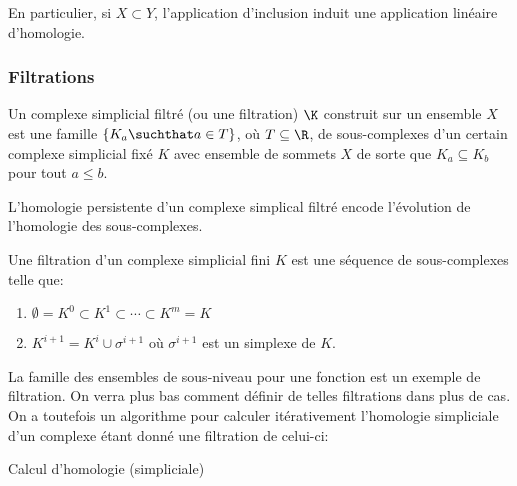 \begin{remarque}
	En particulier, si $X \subset Y$, l'application d'inclusion induit une application linéaire d'homologie.
\end{remarque}

\subsubsection{Filtrations}
\begin{definition}
	Un complexe simplicial filtré (ou une filtration) $\K$ construit sur un ensemble $X$ est une famille
	$\left\{K_{a} \suchthat a \in T\right\}$, où $T \subseteq \R$, de sous-complexes d'un
	certain complexe simplicial fixé $K$ avec ensemble de sommets $X$ de sorte que $K_{a} \subseteq K_{b}$
	pour tout $a \leq b$.
\end{definition}

L'homologie persistente d'un complexe simplical filtré encode l'évolution de l'homologie des sous-complexes.

\begin{definition}
	Une filtration d'un complexe simplicial fini $K$ est une séquence de sous-complexes telle que:
	\begin{enumerate}
		\item $\emptyset = K^{0} \subset K^{1} \subset \cdots \subset K^{m} = K$
		\item $K^{i + 1} = K^{i} \cup \sigma^{i + 1}$ où $\sigma^{i + 1}$ est un simplexe de $K$.
	\end{enumerate}
\end{definition}
La famille des ensembles de sous-niveau pour une fonction est un exemple de filtration.
On verra plus bas comment définir de telles filtrations dans plus de cas.
On a toutefois un algorithme pour calculer itérativement l'homologie simpliciale d'un complexe étant donné
une filtration de celui-ci:
\begin{algorithm}
	\caption{Calcul d'homologie (simpliciale)}
	\label{alg:betti_nop}
	\begin{algorithmic}
		\EndInput
		\Else
		\EndIf
		\EndFor
	\end{algorithmic}
\end{algorithm}

